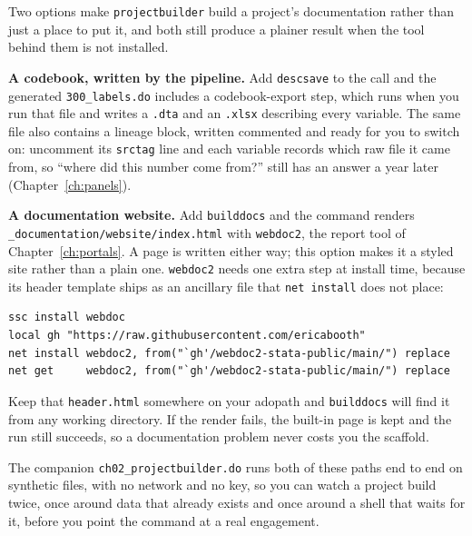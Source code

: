 \begin{kaobox}[frametitle=Package Integration: documentation from the scaffold]
Two options make \texttt{projectbuilder} build a project's documentation rather than just a place to put it, and both still produce a plainer result when the tool behind them is not installed.

\textbf{A codebook, written by the pipeline.} Add \texttt{descsave} to the call and the generated \texttt{300\_labels.do} includes a codebook-export step, which runs when you run that file and writes a \texttt{.dta} and an \texttt{.xlsx} describing every variable. The same file also contains a lineage block, written commented and ready for you to switch on: uncomment its \texttt{srctag} line and each variable records which raw file it came from, so \enquote{where did this number come from?} still has an answer a year later (Chapter~\ref{ch:panels}).

\textbf{A documentation website.} Add \texttt{builddocs} and the command renders \texttt{\_documentation/website/index.html} with \texttt{webdoc2}, the report tool of Chapter~\ref{ch:portals}. A page is written either way; this option makes it a styled site rather than a plain one. \texttt{webdoc2} needs one extra step at install time, because its header template ships as an ancillary file that \texttt{net install} does not place:
\par
{\footnotesize
\begin{verbatim}
ssc install webdoc
local gh "https://raw.githubusercontent.com/ericabooth"
net install webdoc2, from("`gh'/webdoc2-stata-public/main/") replace
net get     webdoc2, from("`gh'/webdoc2-stata-public/main/") replace
\end{verbatim}
}
Keep that \texttt{header.html} somewhere on your adopath and \texttt{builddocs} will find it from any working directory. If the render fails, the built-in page is kept and the run still succeeds, so a documentation problem never costs you the scaffold.
\end{kaobox}

The companion \texttt{ch02\_projectbuilder.do} runs both of these paths end to end on synthetic files, with no network and no key, so you can watch a project build twice, once around data that already exists and once around a shell that waits for it, before you point the command at a real engagement.

